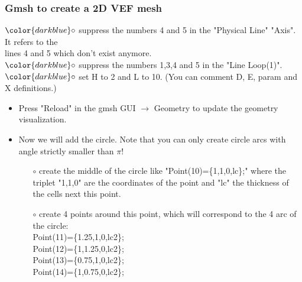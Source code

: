 \documentclass[10pt, hyperref={unicode=true,pdfusetitle, bookmarks=true,bookmarksnumbered=false,bookmarksopen=false, breaklinks=false,pdfborder={0 0 1},backref=true,colorlinks=true,linkcolor=darkblue,pageanchor}]{beamer}
\begin{document}
\begin{frame}
\frametitle{Gmsh to create a 2D VEF mesh}
\begin{block}{}

\hspace{1cm} $\color{darkblue}\circ$ {\small{ suppress the numbers 4 and 5 in the "Physical Line" "Axis". It refers to the \\
\hspace{1.4cm} lines 4 and 5 which don't exist anymore.}}\\
\hspace{1cm} $\color{darkblue}\circ$ {\small{ suppress the numbers 1,3,4 and 5 in the "Line Loop(1)".}}\\
\hspace{1cm} $\color{darkblue}\circ$ {\small{ set H to 2 and L to 10. (You can comment D, E, param and X definitions.)}}

\begin{itemize}
\item Press "Reload" in the gmsh GUI $\rightarrow$ Geometry to update the geometry visualization.
\item Now we will add the circle. Note that you can only create circle arcs with angle strictly smaller than $\pi$!
    \begin{itemize}
    \item [$\circ$] create the middle of the circle like "Point(10)=\{1,1,0,lc\};" where the triplet "1,1,0" are the coordinates of the point and "lc" the thickness of the cells next this point.
    \item [$\circ$] create 4 points around this point, which will correspond to the 4 arc of the circle: \\
Point(11)=\{1.25,1,0,lc2\};\\
Point(12)=\{1,1.25,0,lc2\};\\
Point(13)=\{0.75,1,0,lc2\};\\
Point(14)=\{1,0.75,0,lc2\};
    \end{itemize}

\end{itemize}

\end{block}
\end{frame}
\end{document}
